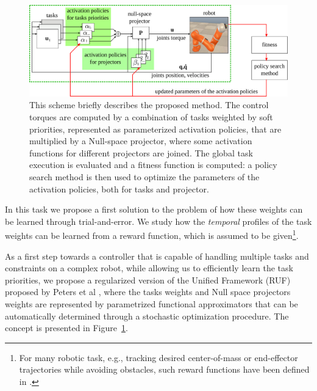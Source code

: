 \documentclass[final,5p,twocolumn]{elsarticle}
\begin{document}
\begin{figure}%
\centering
\includegraphics[width=\linewidth]{./sections/WP4/pics_serena/concept_scheme}
\caption{This scheme briefly describes the proposed method. The control torques are computed by a combination of tasks weighted by soft priorities, represented as parameterized activation policies, that are multiplied by a Null-space projector, where some activation functions for different projectors are joined. The global task execution is evaluated and a fitness function is computed: a policy search method is then used to optimize the parameters of the activation policies, both for tasks and projector. }
\label{figure:scheme}
\end{figure}

In this task we propose a first solution to the problem of how these weights can
be learned through trial-and-error. We study how the \textit{temporal} profiles
of the task weights can be learned from a reward function, which is assumed to
be given\footnote{For many robotic task, e.g., tracking desired center-of-mass
or end-effector trajectories while avoiding obstacles, such reward functions
have been defined in \cite{Kober_IJRR_2013}.}. 

As a first step towards a controller that is capable of handling multiple tasks
and constraints on a complex robot, while allowing us to efficiently learn the
task priorities, we propose a regularized version of the Unified Framework (RUF)
proposed by Peters et al \cite{Peters_AR_2008}, where the tasks weights and
Null space projectors weights are represented by parametrized functional
approximators that can be automatically determined through a stochastic
optimization procedure. The concept is presented in Figure~\ref{figure:scheme}.
\end{document}
